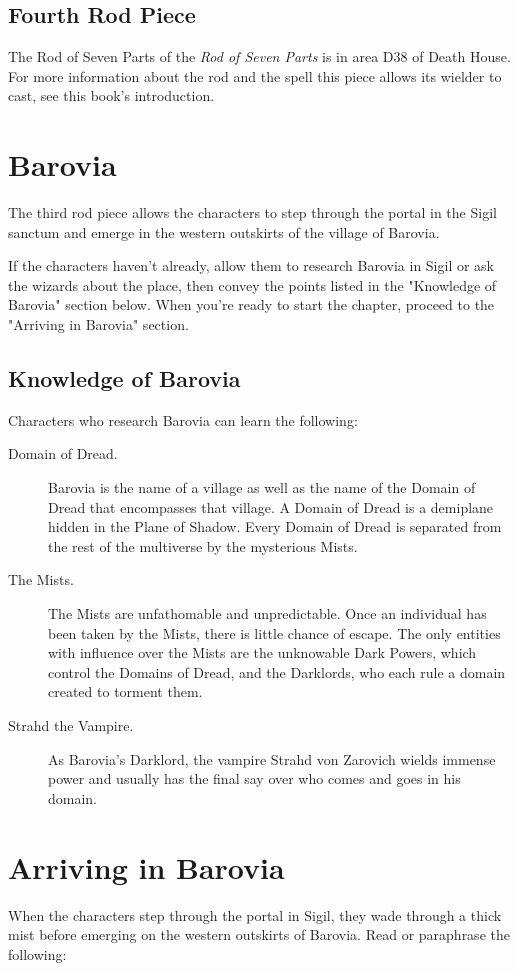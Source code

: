\documentclass[10pt,a4paper,twoside,bg=print,twocolumn,openany,nodeprecatedcode]{dndbook}
\begin{document}
\subsection{Fourth Rod Piece}
The Rod of Seven Parts of the \textit{Rod of Seven Parts} is in area D38 of Death House. For more information about the rod and the spell this piece allows its wielder to cast, see this book's introduction.

\section{Barovia}
The third rod piece allows the characters to step through the portal in the Sigil sanctum and emerge in the western outskirts of the village of Barovia.

If the characters haven't already, allow them to research Barovia in Sigil or ask the wizards about the place, then convey the points listed in the "Knowledge of Barovia" section below. When you're ready to start the chapter, proceed to the "Arriving in Barovia" section.

\subsection{Knowledge of Barovia}
Characters who research Barovia can learn the following:


\begin{description}
\item[Domain of Dread.]
Barovia is the name of a village as well as the name of the Domain of Dread that encompasses that village. A Domain of Dread is a demiplane hidden in the Plane of Shadow. Every Domain of Dread is separated from the rest of the multiverse by the mysterious Mists.
\item[The Mists.]
The Mists are unfathomable and unpredictable. Once an individual has been taken by the Mists, there is little chance of escape. The only entities with influence over the Mists are the unknowable Dark Powers, which control the Domains of Dread, and the Darklords, who each rule a domain created to torment them.
\item[Strahd the Vampire.]
As Barovia's Darklord, the vampire Strahd von Zarovich wields immense power and usually has the final say over who comes and goes in his domain.
\end{description}

\section{Arriving in Barovia}
When the characters step through the portal in Sigil, they wade through a thick mist before emerging on the western outskirts of Barovia. Read or paraphrase the following:
\end{document}
